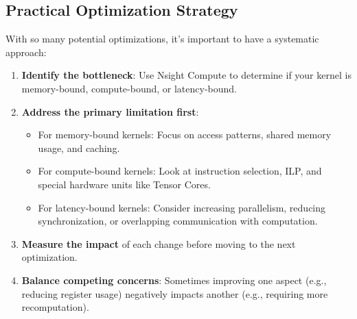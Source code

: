 \subsection{Practical Optimization Strategy}

With so many potential optimizations, it's important to have a systematic approach:

\begin{enumerate}
    \item \textbf{Identify the bottleneck}: Use Nsight Compute to determine if your kernel is memory-bound, compute-bound, or latency-bound.
    
    \item \textbf{Address the primary limitation first}:
    \begin{itemize}
        \item For memory-bound kernels: Focus on access patterns, shared memory usage, and caching.
        \item For compute-bound kernels: Look at instruction selection, ILP, and special hardware units like Tensor Cores.
        \item For latency-bound kernels: Consider increasing parallelism, reducing synchronization, or overlapping communication with computation.
    \end{itemize}
    
    \item \textbf{Measure the impact} of each change before moving to the next optimization.
    
    \item \textbf{Balance competing concerns}: Sometimes improving one aspect (e.g., reducing register usage) negatively impacts another (e.g., requiring more recomputation).
\end{enumerate}



